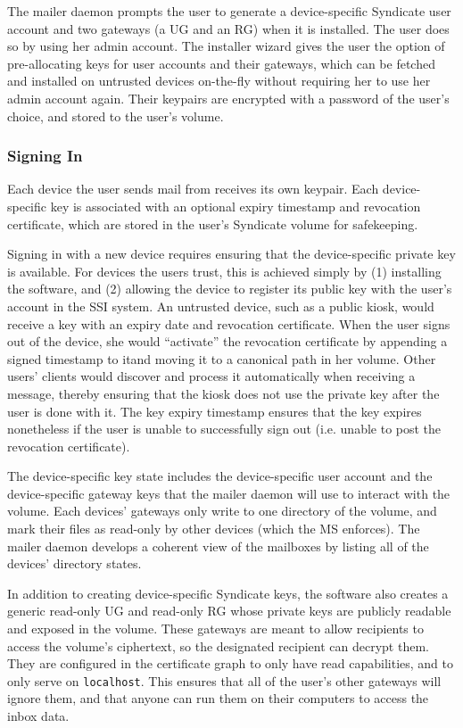 The mailer daemon prompts the user to generate a device-specific
Syndicate user account and two gateways (a UG and an RG)
when it is installed.  The user does so by using her
admin account.  The installer wizard gives the user the option of pre-allocating
keys for user accounts and their gateways, which can be fetched and installed on untrusted devices
on-the-fly without requiring her to use her admin account again.  Their
keypairs are encrypted with a password of the user's choice, and stored to the user's
volume.

\subsubsection{Signing In}

Each device the user sends mail from receives its own keypair.  Each
device-specific key is associated with an optional expiry timestamp and
revocation certificate, which are stored in the user's Syndicate volume for
safekeeping.

Signing in with a new device requires ensuring that the device-specific private key is
available.  For devices the users trust, this is achieved simply by (1)
installing the software, and (2) allowing the device to register its public key
with the user's account in the SSI system.  An untrusted device, such as a
public kiosk, would receive a key with an expiry date and revocation certificate.
When the user signs out of the device, she would ``activate'' the revocation
certificate by appending a signed timestamp to itand 
moving it to a canonical path in her volume.  Other users'
clients would discover and process it automatically when receiving a message,
thereby ensuring that the kiosk does not use the private key after the user is
done with it.  The key expiry timestamp
ensures that the key expires nonetheless if the user is unable to successfully
sign out (i.e. unable to post the revocation certificate).

The device-specific key state includes the device-specific user account and the
device-specific gateway keys that the mailer daemon will use to interact with
the volume.  Each devices' gateways only write to one directory of the volume,
and mark their files as read-only by other devices (which the MS enforces).
The mailer daemon develops a coherent view of the mailboxes by listing all of
the devices' directory states.

In addition to creating device-specific Syndicate keys, the software also
creates a generic read-only UG and read-only RG whose private keys are publicly readable
and exposed in the volume.  These gateways are meant to allow recipients to access
the volume's ciphertext, so the designated recipient can decrypt them.
They are configured in the certificate graph to only have read capabilities, and
to only serve on \texttt{localhost}.  This ensures that all of the user's other
gateways will ignore them, and that anyone can run them on their computers to
access the inbox data.


